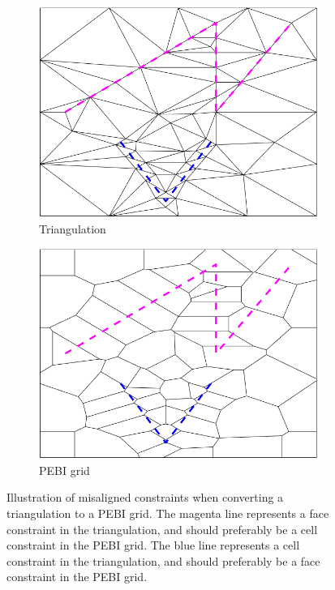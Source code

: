 \begin{figure}[ht]
    \centering
    \begin{subfigure}[b]{0.45\textwidth}
        \centering
        \includegraphics[width=\textwidth]{report/Images/Software/Gmsh limitations/gmsh_conversion_triangulation.png}
        \caption{Triangulation}
        \label{fig:limitation-triangulation}
    \end{subfigure}
    \begin{subfigure}[b]{0.45\textwidth}
        \centering
        \includegraphics[width=\textwidth]{report/Images/Software/Gmsh limitations/gmsh_conversion_PEBI.png}
        \caption{PEBI grid}
        \label{fig:limitation-pebi}
    \end{subfigure}
    \caption[Misaligned constraints when converting triangulation to PEBI grid]{Illustration of misaligned constraints when converting a triangulation to a PEBI grid. The magenta line represents a face constraint in the triangulation, and should preferably be a cell constraint in the PEBI grid. The blue line represents a cell constraint in the triangulation, and should preferably be a face constraint in the PEBI grid.}
    \label{fig:triangulation-to-PEBI-limitation}
\end{figure}

